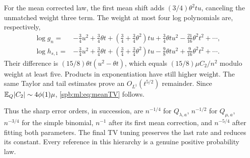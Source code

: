For the mean corrected law, the first mean shift adds $(3/4)\theta^2tu$, canceling the unmatched weight three term. The weight at most four log polynomials are, respectively,
\begin{align*}
 \log g_n={}&-\tfrac34u^2+\tfrac34\theta t+
 (\tfrac34+\tfrac34\theta^2)tu+\tfrac34\theta tu^2
       -\tfrac{21}{16}\theta^2t^2+\cdots,\\
 \log h_{s,1}={}&-\tfrac34u^2+\tfrac34\theta t+
 (\tfrac34+\tfrac34\theta^2)tu-\tfrac98\theta tu^2
       +\tfrac9{16}\theta^2t^2+\cdots.
\end{align*}
Their difference is $(15/8)\theta t(u^2-\theta t)$, which equals $(15/8)\mu C_2/n^2$ modulo weight at least five. Products in exponentiation have still higher weight. The same Taylor and tail estimates prove an $O_{L^1}(t^{5/2})$ remainder. Since $\mathbb E_Q|C_2|\sim4\phi(1)\mu$, \eqref{spb:ml:eq:meanTV} follows.

Thus the sharp error orders, in succession, are $n^{-1/4}$ for $Q_{\lambda,a}$, $n^{-1/2}$ for $Q_{\mu,a}$, $n^{-3/4}$ for the simple binomial, $n^{-1}$ after its first mean correction, and $n^{-5/4}$ after fitting both parameters. The final TV tuning preserves the last rate and reduces its constant. Every reference in this hierarchy is a genuine positive probability law.
